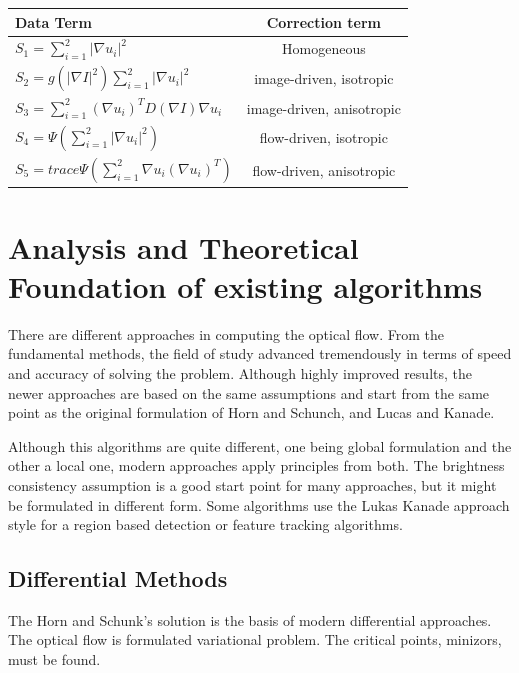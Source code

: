 \documentclass[12pt,a4paper,twoside]{report}
\begin{document}
{\renewcommand{\arraystretch}{2}
	\begin{center}
		
		\begin{tabular}{| l | c |}
			\hline
			Data Term & Correction term  \\ \hline
			$S_1 = \sum_{i=1}^{2}{|\nabla u_i|^2}$ & Homogeneous \\ \hline
			
			$S_2 = g \left( |\nabla I|^2 \right) \sum_{i=1}^{2} {|\nabla u_i|^2}$ & image-driven, isotropic  \\ \hline
			
			$S_3 = \sum_{i=1}^{2} \left( \nabla u_i \right)^T D \left( \nabla I \right) \nabla u_i$ & image-driven, anisotropic  \\
			\hline
			
			$S_4 = \Psi \left( \sum_{i=1}^{2} |\nabla u_i|^2 \right)$ & flow-driven, isotropic  \\
			\hline
			
			$S_5 = trace \Psi \left( \sum_{i=1}^{2} \nabla u_i \left( \nabla u_i \right)^T \right)$  & flow-driven, anisotropic \\
			\hline
		\end{tabular}
	\end{center}

\chapter{Analysis and Theoretical Foundation of existing algorithms}
\label{ch:analysis}
There are different approaches in computing the optical flow. From the fundamental methods, the field of study advanced tremendously in terms of speed and accuracy of solving the problem. Although highly improved results, the newer approaches are based on the same assumptions and start from the same point as the original formulation of Horn and Schunch, and Lucas and Kanade. 

Although this algorithms are quite different, one being global formulation and the other a local one, modern approaches apply principles from both. The brightness consistency assumption is a good start point for many approaches, but it might be formulated in different form. Some algorithms use the Lukas Kanade approach style for a region based detection or feature tracking algorithms.




\section{Differential Methods}
The Horn and Schunk's solution is the basis of modern differential approaches. The optical flow is formulated variational problem. The critical points, minizors, must be found.

}
\end{document}

